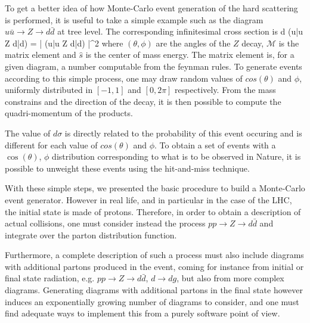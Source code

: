             To get a better idea of how Monte-Carlo event generation of the hard scattering
            is performed, it is useful to take a simple example such as the diagram
            $u\bar{u} \rightarrow Z \rightarrow d\bar{d}$ at tree level. The corresponding
            infinitesimal cross section is
            {
                d \sigma(u\bar{u} \rightarrow Z \rightarrow d\bar{d})
                =
                \left|
                    (u\bar{u} \rightarrow Z \rightarrow d\bar{d})
                \right|^2
            }
            where $(\theta,\phi)$ are the angles of the $Z$ decay, $\mathcal{M}$
            is the matrix element and $\hat{s}$ is the center of mass energy. The matrix
            element is, for a given diagram, a number computable from the feynman rules.
            To generate events according to this simple process, one may draw random
            values of $cos(\theta)$ and $\phi$, uniformly distributed in $[-1, 1]$ and
            $[0,2\pi]$ respectively. From the mass constrains and the direction of the
            decay, it is then possible to compute the quadri-momentum of the products.

            The value of $d\sigma$ is directly related to the probability of this event
            occuring and is different for each value of $cos(\theta)$ and $\phi$. To obtain
            a set of events with a $\cos(\theta)$, $\phi$ distribution corresponding to
            what is to be observed in Nature, it is possible to unweight these events using
            the hit-and-miss technique.

            With these simple steps, we presented the basic procedure to build a Monte-Carlo
            event generator. However in real life, and in particular in the case of the
            LHC, the initial state is made of protons. Therefore, in order to obtain a
            description of actual collisions, one must consider instead the process
            $pp \rightarrow Z \rightarrow d\bar{d}$ and integrate over the parton distribution
            function.

            Furthermore, a complete description of such a process must also include
            diagrams with additional partons produced in the event, coming for instance
            from initial or final state radiation, e.g. $pp \rightarrow Z \rightarrow
            d\bar{d}$, $d\rightarrow dg$, but also from more complex diagrams. Generating
            diagrams with additional partons in the final state however induces an exponentially growing
            number of diagrams to consider, and one must find adequate ways to implement
            this from a purely software point of view.

